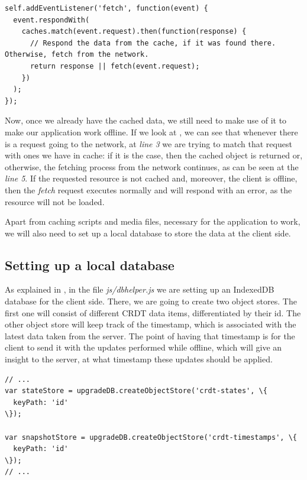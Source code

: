 \begin{lstlisting}[caption={Code for maintaining the requests of the application.}, label={lst:dev5}]
self.addEventListener('fetch', function(event) {
  event.respondWith(
    caches.match(event.request).then(function(response) {
      // Respond the data from the cache, if it was found there. Otherwise, fetch from the network.
      return response || fetch(event.request);
    })
  );
});
\end{lstlisting}

Now, once we already have the cached data, we still need to make use of it to make our application work offline. If we look at , we can see that whenever there is a request going to the network, at \textit{line 3} we are trying to match that request with ones we have in cache: if it is the case, then the cached object is returned or, otherwise, the fetching process from the network continues, as can be seen at the \textit{line 5}. If the requested resource is not cached and, moreover, the client is offline, then the \textit{fetch} request executes normally and will respond with an error, as the resource will not be loaded.

Apart from caching scripts and media files, necessary for the application to work, we will also need to set up a local database to store the data at the client side.

\subsection*{Setting up a local database}

As explained in , in the file \textit{js/dbhelper.js} we are setting up an IndexedDB database for the client side. There, we are going to create two object stores. The first one will consist of different CRDT data items, differentiated by their id. The other object store will keep track of the timestamp, which is associated with the latest data taken from the server. The point of having that timestamp is for the client to send it with the updates performed while offline, which will give an insight to the server, at what timestamp these updates should be applied.

\begin{lstlisting}[caption={Creating object stores in IndexedDB for CRDTs and timestamps.}, label={lst:dev6}]
// ...
var stateStore = upgradeDB.createObjectStore('crdt-states', \{
  keyPath: 'id'
\});

var snapshotStore = upgradeDB.createObjectStore('crdt-timestamps', \{
  keyPath: 'id'
\});
// ...
\end{lstlisting}

